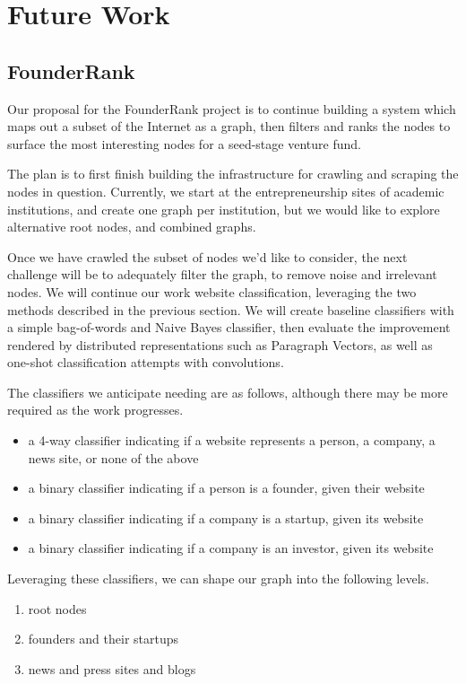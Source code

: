 \section{Future Work}

\subsection{FounderRank}

Our proposal for the FounderRank project is to continue building a system which maps out a subset of the Internet as a graph, then filters and ranks the nodes to surface the most interesting nodes for a seed-stage venture fund.

The plan is to first finish building the infrastructure for crawling and scraping the nodes in question. Currently, we start at the entrepreneurship sites of academic institutions, and create one graph per institution, but we would like to explore alternative root nodes, and combined graphs.

Once we have crawled the subset of nodes we'd like to consider, the next challenge will be to adequately filter the graph, to remove noise and irrelevant nodes. We will continue our work website classification, leveraging the two methods described in the previous section. We will create baseline classifiers with a simple bag-of-words and Naive Bayes classifier, then evaluate the improvement rendered by distributed representations such as Paragraph Vectors, as well as one-shot classification attempts with convolutions.

The classifiers we anticipate needing are as follows, although there may be more required as the work progresses.

\begin{itemize}
  \item a 4-way classifier indicating if a website represents a person, a company, a news site, or none of the above
  \item a binary classifier indicating if a person is a founder, given their website
  \item a binary classifier indicating if a company is a startup, given its website
  \item a binary classifier indicating if a company is an investor, given its website
\end{itemize}

Leveraging these classifiers, we can shape our graph into the following levels.

\begin{enumerate}
  \item root nodes
  \item founders and their startups
  \item news and press sites and blogs
\end{enumerate}

